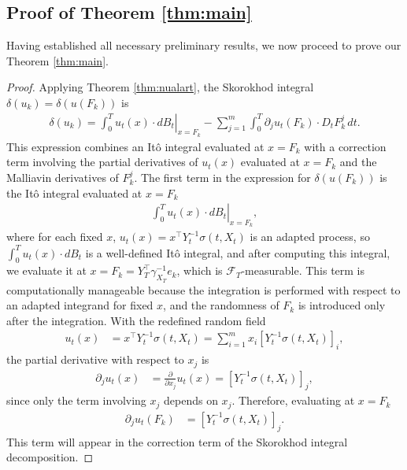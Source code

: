 \documentclass[]{interact}
\newcommand{\1}{\mathbf{1}}
\theoremstyle{plain}%
\theoremstyle{definition}
\theoremstyle{remark}
\numberwithin{equation}{section}
\begin{document}
\subsection{Proof of Theorem \ref{thm:main}}
Having established all necessary preliminary results, we now proceed to prove our Theorem \ref{thm:main}.

\begin{proof}
Applying Theorem \ref{thm:nualart}, the Skorokhod 
integral \( \delta(u_k) = \delta(u(F_k)) \) is
\begin{align}
\delta(u_k) = \left. \int_0^T u_t(x) \cdot dB_t \right|_{x=F_k} - \sum_{j=1}^m \int_0^T \partial_j u_t(F_k) \cdot D_t F_k^j \, dt.
\label{Snualart}
\end{align}
%
This expression combines an It\^o integral evaluated at \( x = F_k \) with a correction term involving the partial derivatives of \( u_t(x) \) evaluated at \( x = F_k \) 
and the Malliavin derivatives of \( F_k^j \).
%
The first term in the expression for \( \delta(u(F_k)) \) is the Itô integral evaluated at \( x = F_k \)
\begin{align*}
\left. \int_0^T u_t(x) \cdot dB_t \right|_{x=F_k},
\end{align*}
where for each fixed \( x \), \( u_t(x) = x^\top Y_t^{-1} \sigma(t, X_t) \) is an adapted process, so \( \int_0^T u_t(x) \cdot dB_t \) is a well-defined Itô integral, and after computing this integral, we evaluate it at \( x = F_k = Y_T^\top \gamma_{X_T}^{-1} e_k \), which is \( \mathcal{F}_T \)-measurable.
%
This term is computationally manageable because the integration is performed with respect to an adapted integrand for fixed \( x \), and the randomness of \( F_k \) is introduced only after the integration.
%
With the redefined random field
\begin{align*}
u_t(x) &= x^\top Y_t^{-1} \sigma(t, X_t) = \sum_{i=1}^m x_i \left[ Y_t^{-1} \sigma(t, X_t) \right]_i,
\end{align*}
the partial derivative with respect to \( x_j \) is
\begin{align*}
\partial_j u_t(x) &= \frac{\partial}{\partial x_j} u_t(x) = \left[ Y_t^{-1} \sigma(t, X_t) \right]_j,
\end{align*}
since only the term involving \( x_j \) depends on \( x_j \). Therefore, evaluating at \( x = F_k \)
\begin{align*}
\partial_j u_t(F_k) &= \left[ Y_t^{-1} \sigma(t, X_t) \right]_j.
\end{align*}
This term will appear in the correction term of the Skorokhod integral decomposition.

\end{proof}
\end{document}
